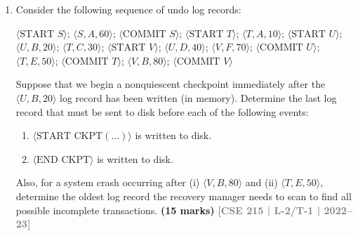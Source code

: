\documentclass[12pt,a3paper]{article}
\newcommand{\yr}[1]{\hfill\textcolor{gray}{\small\textbf{[#1]}}}
\newcommand{\mk}[1]{\textcolor{orange!70!black}{\small\textbf{(#1 marks)}}}
\begin{document}
\begin{enumerate}
\item Consider the following sequence of undo log records:
\begin{center}
\small\ttfamily
$\langle\text{START } S\rangle$; $\langle S, A, 60\rangle$; $\langle\text{COMMIT } S\rangle$; $\langle\text{START } T\rangle$; $\langle T, A, 10\rangle$; 
$\langle\text{START } U\rangle$; $\langle U, B, 20\rangle$; $\langle T, C, 30\rangle$; $\langle\text{START } V\rangle$; $\langle U, D, 40\rangle$; $\langle V, F, 70\rangle$; 
$\langle\text{COMMIT } U\rangle$; $\langle T, E, 50\rangle$; $\langle\text{COMMIT } T\rangle$; $\langle V, B, 80\rangle$; $\langle\text{COMMIT } V\rangle$ 
\end{center}
Suppose that we begin a nonquiescent checkpoint immediately after the $\langle U, B, 20\rangle$ log record has been written (in memory). Determine the last log record that must be sent to disk before each of the following events:
\begin{enumerate}
  \item $\langle\text{START CKPT}(\ldots)\rangle$ is written to disk.
  \item $\langle\text{END CKPT}\rangle$ is written to disk.
\end{enumerate}
Also, for a system crash occurring after (i) $\langle V, B, 80\rangle$ and (ii) $\langle T, E, 50\rangle$, determine the oldest log record the recovery manager needs to scan to find all possible incomplete transactions.
  \mk{15} \yr{CSE 215 | L-2/T-1 | 2022--23}


\end{enumerate}
\end{document}
